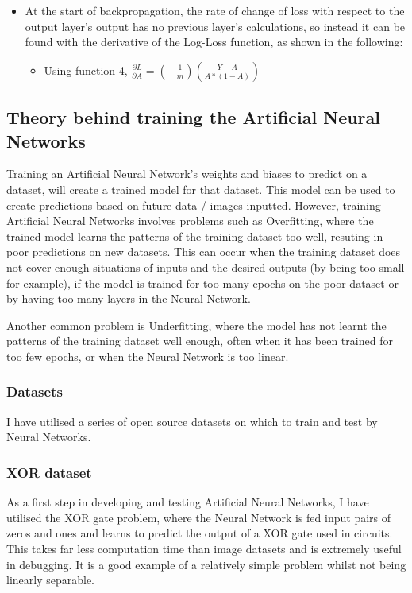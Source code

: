 \documentclass[./project-report/src/latex/project-report.tex]{subfiles}
\begin{document}
\begin{itemize}
\begin{itemize}
    \end{itemize}
    \item At the start of backpropagation, the rate of change of loss with respect to the output layer's output has no previous layer's calculations, so instead it can 
          be found with the derivative of the Log-Loss function, as shown in the following:
    \begin{itemize}
        \item Using function 4, $\frac{\partial{L}}{\partial{A}} = (-\frac{1}{m})(\frac{Y-A}{A * (1-A)})$
    \end{itemize}
\end{itemize}

\subsection{Theory behind training the Artificial Neural Networks}

Training an Artificial Neural Network's weights and biases to predict on a dataset, will create a trained model for that dataset. This model can be used to create 
predictions based on future data / images inputted. However, training Artificial Neural Networks involves problems such as Overfitting, where the trained model learns 
the patterns of the training dataset too well, resuting in poor predictions on new datasets. This can occur when the training dataset does not cover enough situations 
of inputs and the desired outputs (by being too small for example), if the model is trained for too many epochs on the poor dataset or by having too many layers in the 
Neural Network.

Another common problem is Underfitting, where the model has not learnt the patterns of the training dataset well enough, often when it has been trained for too few 
epochs, or when the Neural Network is too linear.

\subsubsection{Datasets}

I have utilised a series of open source datasets on which to train and test by Neural Networks.

\subsubsection{XOR dataset}

As a first step in developing and testing Artificial Neural Networks, I have utilised the XOR gate problem, where the Neural Network is fed input pairs of zeros and 
ones and learns  to predict the output of a XOR gate used in circuits. This takes far less computation time than image datasets and is extremely useful in debugging. 
It is a good example of a relatively simple problem whilst not being linearly separable.
\end{document}
